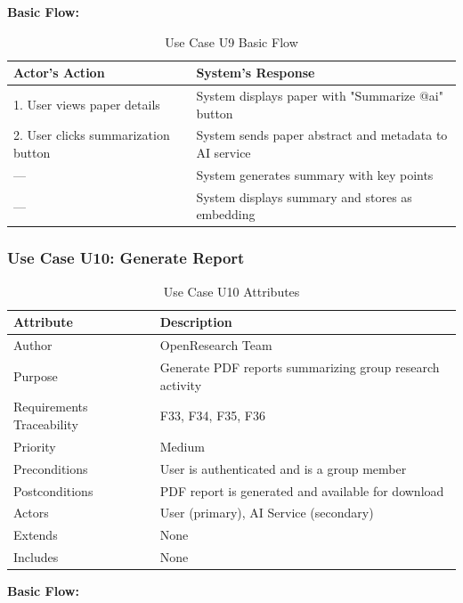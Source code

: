 \documentclass[11pt,a4paper]{article}
\begin{document}
\textbf{Basic Flow:}

\begin{table}[H]
\centering
\begin{tabular}{p{6cm}p{7cm}}
\toprule
\textbf{Actor's Action} & \textbf{System's Response} \\
\midrule
1. User views paper details & System displays paper with "Summarize @ai" button \\
2. User clicks summarization button & System sends paper abstract and metadata to AI service \\
--- & System generates summary with key points \\
--- & System displays summary and stores as embedding \\
\bottomrule
\end{tabular}
\caption{Use Case U9 Basic Flow}
\end{table}

\subsubsection{Use Case U10: Generate Report}

\begin{table}[H]
\centering
\begin{tabular}{p{4cm}p{9cm}}
\toprule
\textbf{Attribute} & \textbf{Description} \\
\midrule
Author & OpenResearch Team \\
Purpose & Generate PDF reports summarizing group research activity \\
Requirements Traceability & F33, F34, F35, F36 \\
Priority & Medium \\
Preconditions & User is authenticated and is a group member \\
Postconditions & PDF report is generated and available for download \\
Actors & User (primary), AI Service (secondary) \\
Extends & None \\
Includes & None \\
\bottomrule
\end{tabular}
\caption{Use Case U10 Attributes}
\end{table}

\textbf{Basic Flow:}
\end{document}
